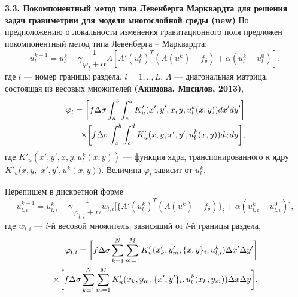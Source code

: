 \documentclass[10pt,pdf, mathserif, hyperref={unicode}]{beamer}
\begin{document}
\begin{frame}{\small\textbf{3.3. Покомпонентный метод типа Левенберга Марквардта для решения задач гравиметрии для модели многослойной среды \textbf{(new)}}}
	По предположению о локальности изменения гравитационного поля предложен покомпонентный метод типа Левенберга -- Марквардта:
	\begin{equation}\label{comp_lm_meth}
	u_l^{k+1}=u_l^k-\gamma\frac{1}{\varphi_l+\bar{\alpha}}\Lambda[ A'(u_l^k)^T(A(u^k)-f_\delta)+\alpha (u_l^k-u_l^0)],
	\end{equation}
	где $l$ --- номер границы раздела, $l=1,..,L$, $\Lambda$ --- диагональная матрица, состоящая из весовых множителей \textbf{\color{red}(Акимова, Мисилов, 2013)}, 
	\begin{equation*}
	\begin{aligned}
	\varphi_l=\bigg[ f\Delta\sigma\int_{a}^{b}\int_{c}^{d}
	K'_u(x',y', x, y, u_l^k(x,y))dx'dy'\bigg] \notag \\ \times\bigg[f\Delta\sigma\int_{a}^{b}\int_{c}^{d}K'_u(x,y, x',y',u_l^k(x,y))dxdy\bigg], 
	\end{aligned}
	\end{equation*} 
	где $K'_u(x',y', x, y, u_l^k(x,y))$ --- функция ядра, транспонированного к ядру $K'_u(x,y,$ $ x',y',u^k(x,y))$. Величина $\varphi_l$ зависит от $u_l^k$.

\end{frame}
\begin{frame}
	Перепишем в дискретной форме
	\begin{equation}\label{comp_lm_meth_disc}
	u_{l,i}^{k+1}=u_{l,i}^k-\gamma\frac{1}{\varphi_{l,i}+\bar{\alpha}}w_{l,i}\bigg[ \{A'(u_l^k)^T(A(u^k)-f_\delta)\}_i+\alpha (u_{l,i}^k-u_{l,i}^0)\bigg],
	\end{equation}
	где $w_{l,i}$ --- $i$-й весовой множитель, зависящий от $l$-й границы раздела,
	\begin{equation*}
	\begin{aligned}
	\varphi_{l,i}=\bigg[ f\Delta\sigma\sum\limits_{k=1}^{N}
	\sum\limits_{m=1}^{M}
	K'_u(x'_k,y'_m, \{x, y\}_i, u_{l,i}^k) \Delta x' \Delta y'\bigg] \notag \\ \times\bigg[f\Delta\sigma\sum\limits_{k=1}^{N}
	\sum\limits_{m=1}^{M}K'_u(x_k,y_m, \{x',y'\}_i,u_l^k(x_k,y_m))\Delta x \Delta y\bigg]. 
	\end{aligned}
	\end{equation*}
	\let\thefootnote\relax\let\thefootnote\relax{}
\end{frame}
\end{document}
